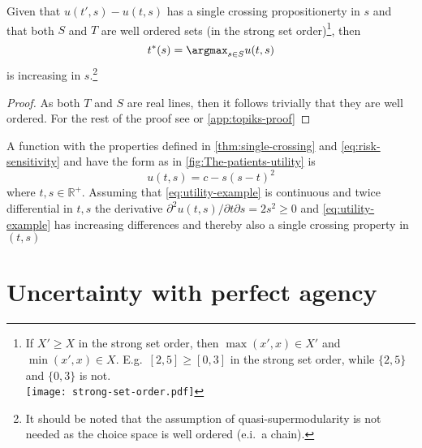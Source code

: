 \begin{proposition}
Given that $u(t',s)-u(t,s)$ has a single crossing propositionerty in $s$ and that both $S$ and $T$ are well ordered sets (in the strong set order)\footnote{If $X' \geq X$ in the strong set order, then $\max (x',x)\in X'$ and $\min (x',x)\in X$. E.g.\ $[2,5]\geq[0,3]$ in the strong set order, while $\{2,5\} $ and $\{0,3\}$ is not. \\
	\texttt{[image: strong-set-order.pdf]}
}, then
\[
	t^{*}(s)=\argmax_{s\in S}u(t,s)\label{eq:increasing-solution}
\]
is increasing in $s$.\footnote{It should be noted that the assumption of quasi-supermodularity is not needed as the choice space is well ordered (e.i.\ a chain).}
\end{proposition}

\begin{proof}
As both $T$ and $S$ are real lines, then it follows trivially that they are well ordered. For the rest of the proof see \textcite{Milgrom1994Monotone} or \cref{app:topiks-proof}
\end{proof}

\begin{example}
A function with the properties defined in \cref{thm:single-crossing} and \cref{eq:risk-sensitivity} and have the form as in \cref{fig:The-patients-utility} is
\[
	u(t,s) = c-s{(s-t)}^{2}\label{eq:utility-example}
\]
where $t,s\in\mathbb{R}^{+}$. Assuming that \cref{eq:utility-example} is continuous and twice differential in $t,s$  the derivative $\partial^{2}u(t,s)\big/\partial t\partial s=2s^{2}\ge0$ and \cref{eq:utility-example} has increasing differences and thereby also a single crossing property in $(t,s)$
\end{example}

\section{Uncertainty with perfect agency}

